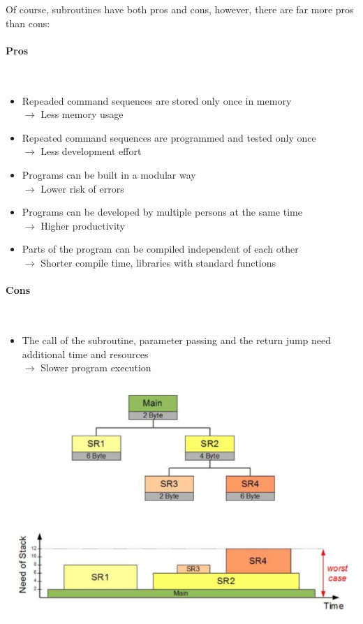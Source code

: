 \documentclass[a4paper, 11pt, nofootinbib]{article}
\begin{document}
\newpage

Of course, subroutines have both pros and cons, however, there are far more pros than cons:
\begin{multicols}{2}
	\paragraph{Pros} \mbox{}\\
	\begin{itemize}
		\item Repeaded command sequences are stored only once in memory \\
			$\rightarrow$ Less memory usage
		\item Repeated command sequences are programmed and tested only once \\
			$\rightarrow$ Less development effort
		\item Programs can be built in a modular way \\
			$\rightarrow$ Lower risk of errors
		\item Programs can be developed by multiple persons at the same time \\
			$\rightarrow$ Higher productivity
		\item Parts of the program can be compiled independent of each other \\
			$\rightarrow$ Shorter compile time, libraries with standard functions
	\end{itemize}
\columnbreak
	\paragraph{Cons}\mbox{}\\
	\begin{itemize}
		\item The call of the subroutine, parameter passing and the return jump need additional time and resources\\
			$\rightarrow$ Slower program execution
	\end{itemize}
		\includegraphics[keepaspectratio=true,height=13\baselineskip]{stack_consumption.jpg}
		\label{fig:stack_consumption}
\end{multicols}
\end{document}
